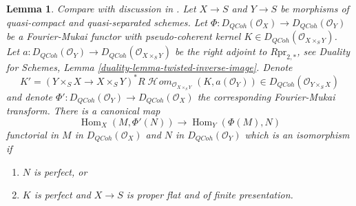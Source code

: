 \documentclass{stacks-project}
\newenvironment{reference}{\comment}{\endcomment}
\theoremstyle{plain}
\newtheorem{lemma}[subsection]{Lemma}
\theoremstyle{definition}
\theoremstyle{remark}
\numberwithin{equation}{subsection}
\def\Hom{\mathop{\mathrm{Hom}}\nolimits}
\def\SheafHom{\mathop{\mathcal{H}\!\mathit{om}}\nolimits}
\def\QCoh{\mathit{QCoh}}
\begin{document}
\begin{lemma}
\label{lemma-fourier-mukai-right-adjoint}
\begin{reference}
Compare with discussion in \cite{Rizzardo}.
\end{reference}
Let $X \to S$ and $Y \to S$ be morphisms of quasi-compact and quasi-separated
schemes. Let $\Phi : D_\QCoh(\mathcal{O}_X) \to D_\QCoh(\mathcal{O}_Y)$
be a Fourier-Mukai functor with pseudo-coherent kernel
$K \in D_\QCoh(\mathcal{O}_{X \times_S Y})$.
Let $a : D_\QCoh(\mathcal{O}_Y) \to  D_\QCoh(\mathcal{O}_{X \times_S Y})$
be the right adjoint to $R\text{pr}_{2, *}$, see
Duality for Schemes, Lemma \ref{duality-lemma-twisted-inverse-image}.
Denote
$$
K' = (Y \times_S X \to X \times_S Y)^*
R\SheafHom_{\mathcal{O}_{X \times_S Y}}(K, a(\mathcal{O}_Y)) \in
D_\QCoh(\mathcal{O}_{Y \times_S X})
$$
and denote $\Phi' : D_\QCoh(\mathcal{O}_Y) \to D_\QCoh(\mathcal{O}_X)$
the corresponding Fourier-Mukai transform. There is a canonical map
$$
\Hom_X(M, \Phi'(N)) \longrightarrow \Hom_Y(\Phi(M), N)
$$
functorial in $M$ in $D_\QCoh(\mathcal{O}_X)$ and $N$ in
$D_\QCoh(\mathcal{O}_Y)$ which is an isomorphism if
\begin{enumerate}
\item $N$ is perfect, or
\item $K$ is perfect and $X \to S$ is proper flat and of finite presentation.
\end{enumerate}
\end{lemma}
\end{document}
